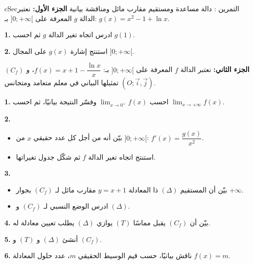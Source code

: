 \documentclass[12pt,a4paper]{article}
\newenvironment{BOX}[2]{\begin{otherlanguage}{english}\begin{arbox}{#1}{#2}}{\end{arbox}\end{otherlanguage}}
\newcounter{exo}
\newenvironment{tamrin}[1]{\stepcounter{exo}\begin{BOX}{cSec}{التمرين \theexo: #1}}{\end{BOX}}
\newenvironment{sq}{\begin{itemize}[leftmargin=2.4em,itemsep=3pt]}{\end{itemize}}
\newcommand{\qa}{\item[(أ)]}\newcommand{\qb}{\item[(ب)]}\newcommand{\qc}{\item[(جـ)]}\newcommand{\qd}{\item[(د)]}\newcommand{\qe}{\item[(هـ)]}
\newcommand{\QQ}[1]{\par\smallskip\textbf{#1.} }
\begin{document}
\begin{tamrin}{دالة مساعدة ومستقيم مقارب مائل ومناقشة بيانية}
\textbf{الجزء الأول:} نعتبر الدالة $g$ المعرفة على $]0;+\infty[$ بـ: $g(x)=x^2-1+\ln x$.
\QQ{1} ادرس اتجاه تغير الدالة $g$ ثم احسب $g(1)$.
\QQ{2} استنتج إشارة $g(x)$ على المجال $]0;+\infty[$.

\textbf{الجزء الثاني:} نعتبر الدالة $f$ المعرفة على $]0;+\infty[$ بـ: $f(x)=x+1-\dfrac{\ln x}{x}$، و $(C_f)$ تمثيلها البياني في معلم متعامد ومتجانس $(O;\vec i,\vec j)$.
\QQ{1} احسب $\displaystyle\lim_{x\to0^{+}}f(x)$ وفسّر النتيجة بيانيًا، ثم احسب $\displaystyle\lim_{x\to+\infty}f(x)$.
\QQ{2}
\begin{sq}
\qa بيّن أنه من أجل كل عدد حقيقي $x$ من $]0;+\infty[$: $f'(x)=\dfrac{g(x)}{x^2}$.
\qb استنتج اتجاه تغير الدالة $f$ ثم شكّل جدول تغيراتها.
\end{sq}
\QQ{3}
\begin{sq}
\qa بيّن أن المستقيم $(\Delta)$ ذا المعادلة $y=x+1$ مقارب مائل لـ $(C_f)$ بجوار $+\infty$.
\qb ادرس الوضع النسبي لـ $(C_f)$ و $(\Delta)$.
\end{sq}
\QQ{4} بيّن أن $(C_f)$ يقبل مماسًا $(T)$ يوازي $(\Delta)$ يطلب تعيين معادلة له.
\QQ{5} أنشئ $(\Delta)$ و $(T)$ و $(C_f)$.
\QQ{6} ناقش بيانيًا، حسب قيم الوسيط الحقيقي $m$، عدد حلول المعادلة $f(x)=m$.
\end{tamrin}
\end{document}
